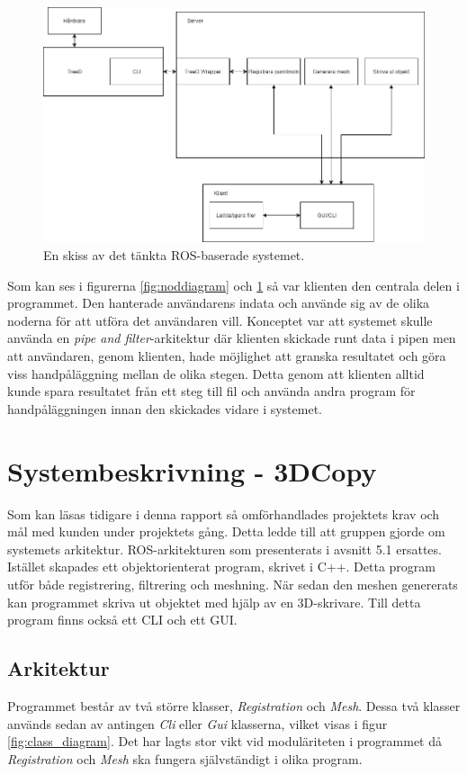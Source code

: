 \begin{figure}[H]
	\centering
	\includegraphics[width=130mm]{figures/Systemskiss_gamla.png}
	\caption{En skiss av det tänkta ROS-baserade systemet.}
	\label{fig:systembeskrivning_gamla}
\end{figure}

Som kan ses i figurerna \ref{fig:noddiagram} och \ref{fig:systembeskrivning_gamla} så var klienten den centrala delen i programmet. Den hanterade användarens indata och använde sig av de olika noderna för att utföra det användaren vill. Konceptet var att systemet skulle använda en \textit{pipe and filter}-arkitektur där klienten skickade runt data i pipen men att användaren, genom klienten, hade möjlighet att granska resultatet och göra viss handpåläggning mellan de olika stegen. Detta genom att klienten alltid kunde spara resultatet från ett steg till fil och använda andra program för handpåläggningen innan den skickades vidare i systemet.

\section{Systembeskrivning - 3DCopy}

Som kan läsas tidigare i denna rapport så omförhandlades projektets krav och mål med kunden under projektets gång. Detta ledde till att gruppen gjorde om systemets arkitektur. ROS-arkitekturen som presenterats i avsnitt 5.1 ersattes. Istället skapades ett objektorienterat program, skrivet i C++. Detta program utför både registrering, filtrering och meshning. När sedan den meshen genererats kan programmet skriva ut objektet med hjälp av en 3D-skrivare. Till detta program finns också ett CLI och ett GUI.

\subsection{Arkitektur}
Programmet består av två större klasser, \textit{Registration} och \textit{Mesh}. Dessa två klasser används sedan av antingen \textit{Cli}  eller \textit{Gui} klasserna, vilket visas i figur \ref{fig:class_diagram}.  Det har lagts stor vikt vid moduläriteten i programmet då \textit{Registration} och \textit{Mesh} ska fungera självständigt i olika program.

